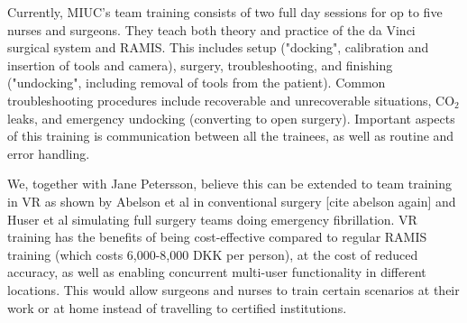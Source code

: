\documentclass[conference]{IEEEtran}
\begin{document}
Currently, MIUC's team training consists of two full day sessions for op to five nurses and surgeons. They teach both theory and practice of the da Vinci surgical system and RAMIS. This includes setup ("docking", calibration and insertion of tools and camera), surgery, troubleshooting, and finishing ("undocking", including removal of tools from the patient). Common troubleshooting procedures include recoverable and unrecoverable situations, CO$_2$ leaks, and emergency undocking (converting to open surgery). Important aspects of this training is communication between all the trainees, as well as routine and error handling.

We, together with Jane Petersson, believe this can be extended to team training in VR as shown by Abelson et al in conventional surgery [cite abelson again] and Huser et al simulating full surgery teams doing emergency fibrillation. VR training has the benefits of being cost-effective compared to regular RAMIS training (which costs 6,000-8,000 DKK per person), at the cost of reduced accuracy, as well as enabling concurrent multi-user functionality in different locations. This would allow surgeons and nurses to train certain scenarios at their work or at home instead of travelling to certified institutions. 


%
%

\end{document}
